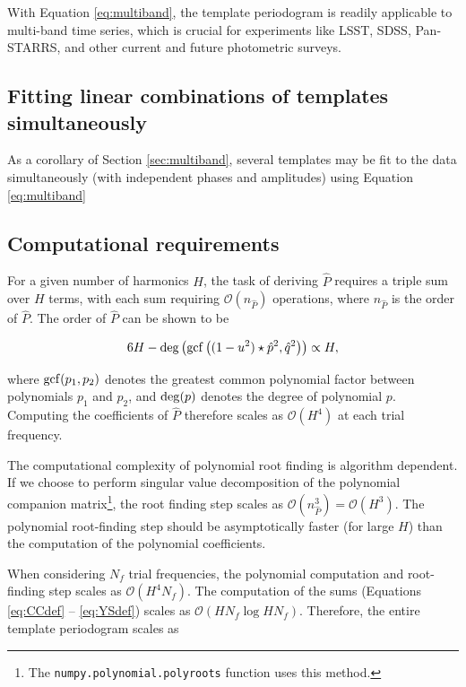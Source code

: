 \documentclass[apj]{emulateapj}
\newcommand{\bigO}{\mathcal{O}}
\begin{document}
With Equation \ref{eq:multiband}, the template periodogram is readily applicable to multi-band 
time series, which is crucial for experiments like LSST, SDSS, Pan-STARRS, and other current 
and future photometric surveys.


\subsection{Fitting linear combinations of templates simultaneously}
As a corollary of Section \ref{sec:multiband}, several templates may
be fit to the data simultaneously (with independent phases and amplitudes)
using Equation \ref{eq:multiband}

\subsection{Computational requirements}

For a given number of harmonics $H$, the task of deriving 
$\hat{P}$ requires a triple sum over $H$ terms, with each sum
requiring $\bigO(n_{\hat{P}})$ operations, where $n_{\hat{P}}$ is the order
of $\hat{P}$. The order of $\hat{P}$ can be shown to be

\begin{equation}
6H - {\rm deg}\left({\rm gcf}\left((1 - u^2)\star\hat{p}^2, \hat{q}^2\right)\right) \propto H,
\end{equation}

\noindent where ${\rm gcf}(p_1, p_2)$ denotes the greatest common polynomial factor
between polynomials $p_1$ and $p_2$, and ${\rm deg}(p)$ denotes the degree of polynomial $p$. 
Computing the coefficients of $\hat{P}$ therefore scales as $\bigO(H^4)$ at each trial frequency. 

The computational complexity of polynomial root finding
is algorithm dependent. If we choose to perform singular value decomposition of
the polynomial companion matrix\footnote{The \texttt{numpy.polynomial.polyroots} 
function uses this method.}, the root finding step scales as 
$\bigO(n_{\hat{P}}^3) = \bigO(H^3)$. The polynomial root-finding step 
should be asymptotically faster (for large $H$) than the computation of 
the polynomial coefficients.

When considering $N_f$ trial frequencies, the polynomial computation and root-finding 
step scales as $\bigO(H^4N_f)$. The computation of the sums 
(Equations \ref{eq:CCdef} -- \ref{eq:YSdef}) scales as $\bigO(HN_f\log HN_f)$.
Therefore, the entire template periodogram scales as 
\end{document}
